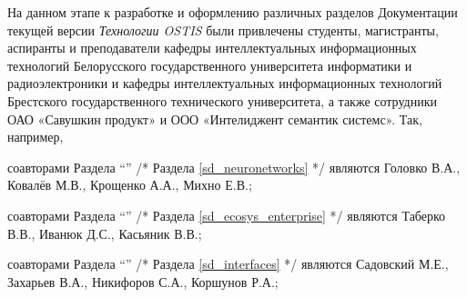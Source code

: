 \begin{SCn}
{На данном этапе к разработке и оформлению различных разделов Документации текущей версии \textit{Технологии OSTIS} были привлечены студенты, магистранты, аспиранты и преподаватели кафедры интеллектуальных информационных технологий Белорусского государственного университета информатики и радиоэлектроники и кафедры интеллектуальных информационных технологий Брестского государственного технического университета, а также сотрудники ОАО «Савушкин продукт» и ООО «Интелиджент семантик системс». Так, например,
\begin{scnitemize}
\item соавторами Раздела ``''{} /* Раздела \ref{sd_neuronetworks} */ являются Головко В.А., Ковалёв М.В., Крощенко А.А., Михно Е.В.;
\item соавторами Раздела ``''{} /* Раздела \ref{sd_ecosys_enterprise} */ являются Таберко В.В., Иванюк Д.С., Касьяник В.В.;
\item соавторами Раздела ``''{}  /* Раздела \ref{sd_interfaces} */ являются Садовский М.Е., Захарьев В.А.,  Никифоров С.А., Коршунов Р.А.;
\end{scnitemize}
}


\scnendstruct

\end{SCn}
